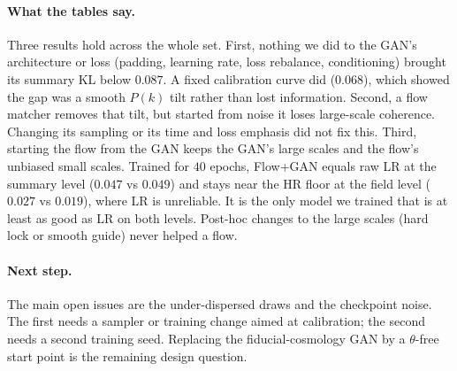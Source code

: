 \paragraph{What the tables say.} Three results hold across the whole set.
First, nothing we did to the GAN's architecture or loss (padding, learning rate,
loss rebalance, conditioning) brought its summary KL below $0.087$. A fixed
calibration curve did ($0.068$), which showed the gap was a smooth $P(k)$ tilt
rather than lost information. Second, a flow matcher removes that tilt, but
started from noise it loses large-scale coherence. Changing its sampling or its
time and loss emphasis did not fix this. Third, starting the flow from the GAN
keeps the GAN's large scales and the flow's unbiased small scales. Trained for
$40$ epochs, Flow+GAN equals raw LR at the summary level ($0.047$ vs $0.049$) and
stays near the HR floor at the field level ($0.027$ vs $0.019$), where LR is
unreliable. It is the only model we trained that is at least as good as LR on both
levels. Post-hoc changes to the large scales (hard lock or smooth guide) never
helped a flow.

\paragraph{Next step.} The main open issues are the under-dispersed draws and
the checkpoint noise. The first needs a sampler or training change aimed at
calibration; the second needs a second training seed. Replacing the
fiducial-cosmology GAN by a $\theta$-free start point is the remaining design
question.

